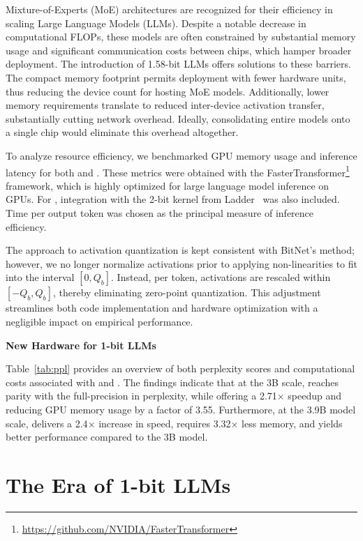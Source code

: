 Mixture-of-Experts (MoE) architectures are recognized for their efficiency in scaling Large Language Models (LLMs). Despite a notable decrease in computational FLOPs, these models are often constrained by substantial memory usage and significant communication costs between chips, which hamper broader deployment. The introduction of 1.58-bit LLMs offers solutions to these barriers. The compact memory footprint permits deployment with fewer hardware units, thus reducing the device count for hosting MoE models. Additionally, lower memory requirements translate to reduced inter-device activation transfer, substantially cutting network overhead. Ideally, consolidating entire models onto a single chip would eliminate this overhead altogether.

To analyze resource efficiency, we benchmarked GPU memory usage and inference latency for both  and . These metrics were obtained with the FasterTransformer\footnote{\url{https://github.com/NVIDIA/FasterTransformer}} framework, which is highly optimized for large language model inference on GPUs. For , integration with the 2-bit kernel from Ladder~\cite{ladder} was also included. Time per output token was chosen as the principal measure of inference efficiency.

The approach to activation quantization is kept consistent with BitNet's method; however, we no longer normalize activations prior to applying non-linearities to fit into the interval $[0, Q_b]$. Instead, per token, activations are rescaled within $[-Q_b, Q_b]$, thereby eliminating zero-point quantization. This adjustment streamlines both code implementation and hardware optimization with a negligible impact on empirical performance.

\textbf{New Hardware for 1-bit LLMs}

Table~\ref{tab:ppl} provides an overview of both perplexity scores and computational costs associated with  and . The findings indicate that at the 3B scale,  reaches parity with the full-precision  in perplexity, while offering a 2.71$\times$ speedup and reducing GPU memory usage by a factor of 3.55. Furthermore, at the 3.9B model scale,  delivers a 2.4$\times$ increase in speed, requires 3.32$\times$ less memory, and yields better performance compared to the  3B model.

\section{The Era of 1-bit LLMs}

